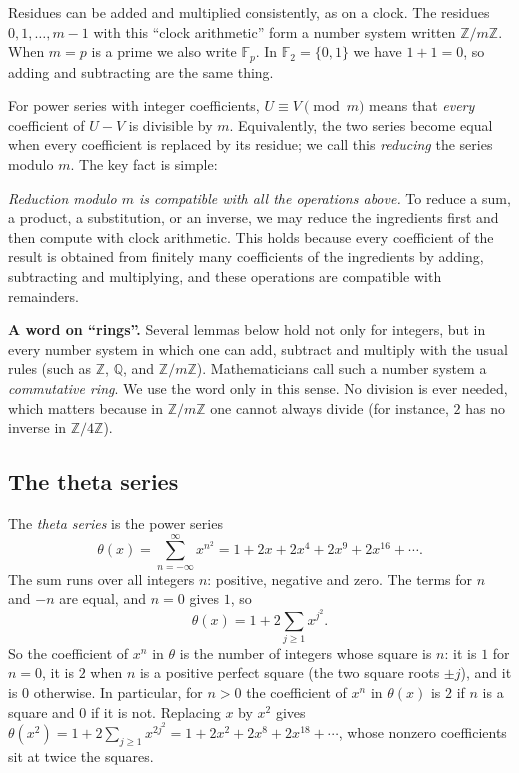 \documentclass[11pt,a4paper]{article}
\theoremstyle{definition}
\theoremstyle{remark}
\newcommand{\Z}{\mathbb{Z}}
\newcommand{\Q}{\mathbb{Q}}
\newcommand{\F}{\mathbb{F}}
\newcommand{\para}[1]{\par\medskip\noindent\textbf{#1}\enspace}
\begin{document}
Residues can be added and multiplied consistently, as on a clock. The residues $0,1,\dots,m-1$ with this ``clock
arithmetic'' form a number system written $\Z/m\Z$. When $m=p$ is a prime we also write $\F_p$. In $\F_2=\{0,1\}$ we
have $1+1=0$, so adding and subtracting are the same thing.

For power series with integer coefficients, $U\equiv V\pmod m$ means that \emph{every} coefficient of $U-V$ is
divisible by $m$. Equivalently, the two series become equal when every coefficient is replaced by its residue; we call
this \emph{reducing} the series modulo $m$. The key fact is simple:

\emph{Reduction modulo $m$ is compatible with all the operations above.} To reduce a sum, a product, a substitution, or
an inverse, we may reduce the ingredients first and then compute with clock arithmetic. This holds because every
coefficient of the result is obtained from finitely many coefficients of the ingredients by adding, subtracting and
multiplying, and these operations are compatible with remainders.

\para{A word on ``rings''.} Several lemmas below hold not only for integers, but in every number system in
which one can add, subtract and multiply with the usual rules (such as $\Z$, $\Q$, and $\Z/m\Z$). Mathematicians call
such a number system a \emph{commutative ring}. We use the word only in this sense. No division is ever needed, which
matters because in $\Z/m\Z$ one cannot always divide (for instance, $2$ has no inverse in $\Z/4\Z$).

\subsection{The theta series}
The \emph{theta series} is the power series
\[
\theta(x)=\sum_{n=-\infty}^{\infty}x^{n^2}=1+2x+2x^4+2x^9+2x^{16}+\cdots .
\]
The sum runs over all integers $n$: positive, negative and zero. The terms for $n$ and $-n$ are equal, and $n=0$
gives $1$, so
\[
\theta(x)=1+2\sum_{j\ge1}x^{j^2}.
\]
So the coefficient of $x^n$ in $\theta$ is the number of integers whose square is $n$: it is $1$ for $n=0$, it is $2$
when $n$ is a positive perfect square (the two square roots $\pm j$), and it is $0$ otherwise. In particular, for
$n>0$ the coefficient of $x^n$ in $\theta(x)$ is $2$ if $n$ is a square and $0$ if it is not. Replacing $x$ by $x^2$
gives $\theta(x^2)=1+2\sum_{j\ge1}x^{2j^2}=1+2x^2+2x^8+2x^{18}+\cdots$, whose nonzero coefficients sit at twice the
squares.
\end{document}
